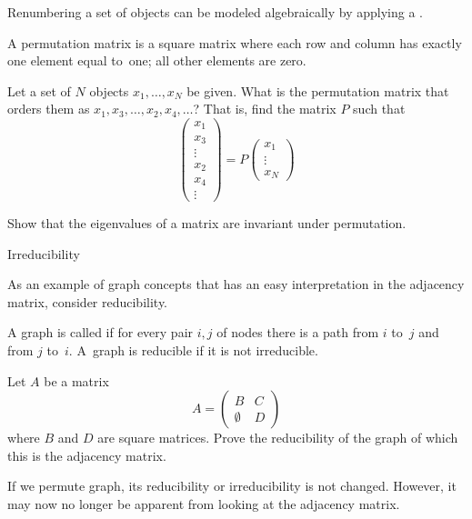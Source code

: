 Renumbering a set of objects can be modeled algebraically by
applying a .
\begin{definition}
A permutation matrix is a square matrix where each row and column
has exactly one element equal to~one; all other elements are zero.
\end{definition}

\begin{exercise}
Let a set of $N$ objects $x_1,\ldots,x_N$ be given. What is the 
permutation matrix that orders them as $x_1,x_3,\ldots,x_2,x_4,\ldots$?
That is, find the matrix $P$ such that
\[
\begin{pmatrix}
x_1\\x_3\\\vdots\\x_2\\x_4\\\vdots
\end{pmatrix} = P
\begin{pmatrix}
x_1\\\vdots\\x_N
\end{pmatrix}
\]
\end{exercise}

\begin{exercise}
Show that the eigenvalues of a matrix are invariant under permutation.
\end{exercise}

 {Irreducibility}

As an example of graph concepts that has an easy interpretation in the
adjacency matrix, consider reducibility.

\begin{definition}
A graph is called  if for every pair $i,j$ of
nodes there is a path from $i$ to~$j$ and from $j$ to~$i$. A~graph is
reducible if it is not irreducible.
\end{definition}

\begin{exercise}
  Let $A$ be a matrix
  \[ A=
  \begin{pmatrix}
    B&C\\ \emptyset&D
  \end{pmatrix}
  \]
  where $B$ and $D$ are square matrices. Prove the reducibility of the
  graph of which this is the adjacency matrix.
\end{exercise}

If we permute graph, its reducibility or irreducibility is not
changed. However, it may now no longer be apparent from looking 
at the adjacency matrix.

